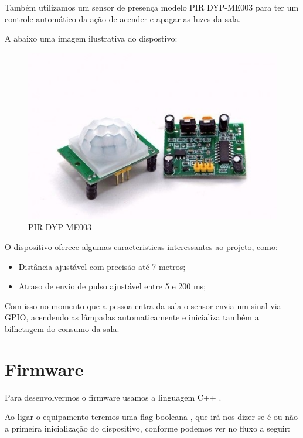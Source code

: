 \documentclass[openright]{normas-utf-tex} %
\begin{document}
Também utilizamos um sensor de presença modelo PIR DYP-ME003   \cite{openimpulse}
para ter um controle automático da ação de acender e apagar as luzes da sala.

A abaixo uma imagem ilustrativa do dispostivo:
\begin{figure}[!htb]
     \centering
     \includegraphics[scale=0.6]{PIR.jpg}
     \caption{PIR DYP-ME003}
     \label{fig:PIR DYP-ME003}
\end{figure}

O dispositivo oferece algumas caracteristicas interessantes ao projeto, como:

\begin{itemize}
    \item Distância ajustável com precisão até 7 metros;
    \item Atraso de envio de pulso ajustável entre 5 e 200 ms;
\end{itemize}

Com isso no momento que a pessoa entra da sala o sensor envia um sinal  via GPIO,  acendendo as lâmpadas automaticamente e inicializa também a bilhetagem do consumo da sala.

\section{Firmware}

Para desenvolvermos o firmware usamos a linguagem C++ \cite{Altabooks}. 

Ao ligar o equipamento teremos uma flag booleana \cite{Elsevier}, que irá nos dizer se é ou não a primeira inicialização do dispositivo, conforme podemos ver no fluxo a seguir:
\end{document}
